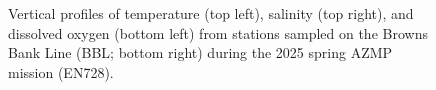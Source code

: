 \documentclass[12pt]{article}\usepackage[]{graphicx}\usepackage[]{color}
\begin{document}
\begin{appendices}
\begin{figure}[H]
{\centering {} 

}

\caption{Vertical profiles of temperature (top left), salinity (top right), and dissolved oxygen (bottom left) from stations sampled on the Browns Bank Line (BBL; bottom right) during the 2025 spring AZMP mission (EN728).}\label{fig:figureA1}
\end{figure}
\clearpage
\begin{figure}[htb]

{\centering {} 

}
\end{figure}
\end{appendices}
\end{document}
